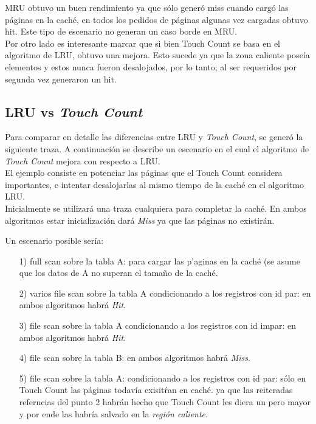 \documentclass[11pt, a4paper, spanish]{article}
\begin{document}
MRU obtuvo un buen rendimiento ya que s\'olo gener\'o miss cuando carg\'o las p\'aginas en la cach\'e, en todos los pedidos de p\'aginas algunas vez cargadas obtuvo hit. Este tipo de escenario no generan un caso borde en MRU.\\

Por otro lado es interesante marcar que si bien Touch Count se basa en el algoritmo de LRU, obtuvo una mejora. Esto sucede ya que la zona caliente pose\'ia elementos y estos nunca fueron desalojados, por lo tanto; al ser requeridos por segunda vez generaron un hit.\\


\subsection{ LRU vs \textit{Touch Count}}

Para comparar en detalle las diferencias entre LRU y \textit{Touch Count}, se gener\'o la siguiente traza. A continuaci\'on se describe un escenario en el cual el algoritmo de \textit{Touch Count} mejora con respecto a LRU.\\

El ejemplo consiste en potenciar las p\'aginas que el Touch Count considera importantes, e intentar desalojarlas al mismo tiempo de la cach\'e en el
algoritmo LRU.\\

Inicialmente se utilizar\'a una traza cualquiera para completar la cach\'e. En ambos algoritmos estar inicializaci\'on dar\'a \textit{Miss} ya que
las p\'aginas no existir\'an.

Un escenario posible ser\'ia:

\begin{itemize}
	\item[1)] full scan sobre la tabla A: para cargar las p'aginas en la cach\'e (se asume que los datos de A no superan el tama\~{n}o de la cach\'e.
	\item[2)] varios file scan sobre la tabla A condicionando a los registros con id par: en ambos algoritmos habr\'a \textit{Hit}.
	\item[3)] file scan sobre la tabla A condicionando a los registros con id impar: en ambos algoritmos habr\'a \textit{Hit}.
	\item[4)] file scan sobre la tabla B: en ambos algoritmos habr\'a \textit{Miss}.
	\item[5)] file scan sobre la tabla A: condicionando a los registros con id par: s\'olo en Touch Count las p\'aginas todav\'ia exisit\'ran en cach\'e.
ya que las reiteradas referncias del punto 2 habr\'an hecho que Touch Count les diera un pero mayor y por ende las habr\'ia salvado en la \textit{regi\'on caliente}.
\end{itemize}
\end{document}
